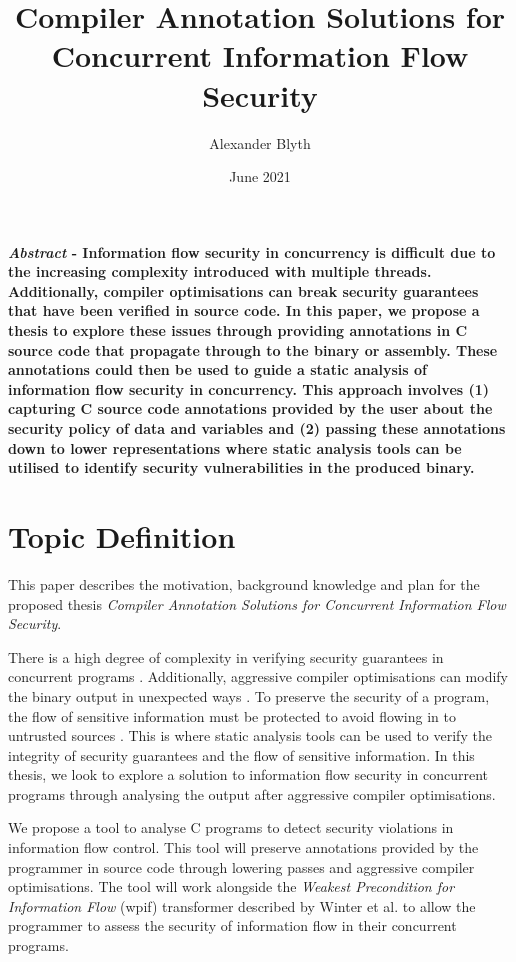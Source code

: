 \documentclass[twocolumn]{article}
\title{Compiler Annotation Solutions for Concurrent Information Flow Security}
\author{Alexander Blyth}
\date{June 2021}
\begin{document}
\maketitle

\textbf{\textit{Abstract} - Information flow security in concurrency is difficult due to the increasing complexity introduced with multiple threads. Additionally, compiler optimisations can break security guarantees that have been verified in source code. In this paper, we propose a thesis to explore these issues through providing annotations in C source code that propagate through to the binary or assembly. These annotations could then be used to guide a static analysis of information flow security in concurrency. This approach involves (1) capturing C source code annotations provided by the user about the security policy of data and variables and (2) passing these annotations down to lower representations where static analysis tools can be utilised to identify security vulnerabilities in the produced binary. }

\section{Topic Definition}
This paper describes the motivation, background knowledge and plan for the proposed thesis \textit{Compiler Annotation Solutions for Concurrent Information Flow Security}.

There is a high degree of complexity in verifying security guarantees in concurrent programs \cite{mantel2014noninterference}\cite{smith2019value}\cite{vaughan2012secure}. Additionally, aggressive compiler optimisations can modify the binary output in unexpected ways \cite{d2015correctness}. To preserve the security of a program, the flow of sensitive information must be protected to avoid flowing in to untrusted sources \cite{balliu2014logics}. This is where static analysis tools can be used to verify the integrity of security guarantees and the flow of sensitive information. In this thesis, we look to explore a solution to information flow security in concurrent programs through analysing the output after aggressive compiler optimisations.

We propose a tool to analyse C programs to detect security violations in information flow control. This tool will preserve annotations provided by the programmer in source code through lowering passes and aggressive compiler optimisations. The tool will work alongside the \textit{Weakest Precondition for Information Flow} (wpif) transformer described by Winter et al. \cite{winter2020information} to allow the programmer to assess the security of information flow in their concurrent programs.
\end{document}
